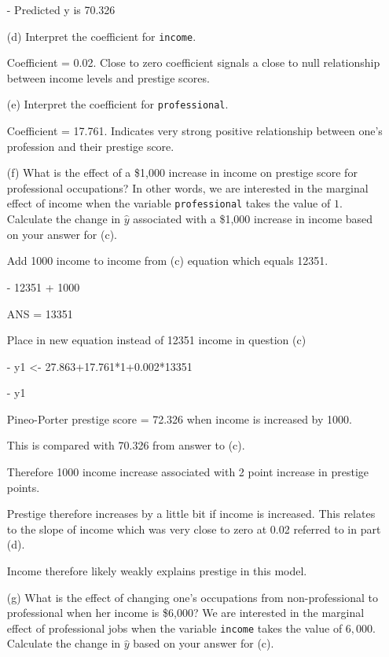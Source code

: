 \documentclass[12pt,letterpaper]{article}
\begin{document}
\begin{enumerate}
-	Predicted y is 70.326
\newpage
	\item [(d)]
	Interpret the coefficient for \texttt{income}.

Coefficient = 0.02. Close to zero coefficient signals a close to null relationship between income levels and prestige scores.
	\vspace{10cm}	
	\item [(e)]
	Interpret the coefficient for \texttt{professional}.

Coefficient = 17.761. Indicates very strong positive relationship between one's profession and their prestige score. 
	
	\newpage
	\item [(f)]
	What is the effect of a \$1,000 increase in income on prestige score for professional occupations? In other words, we are interested in the marginal effect of income when the variable \texttt{professional} takes the value of $1$. Calculate the change in $\hat{y}$ associated with a \$1,000 increase in income based on your answer for (c).
	
Add 1000 income to income from (c) equation which equals 12351. 

- 12351 + 1000 

ANS = 13351

Place in new equation instead of 12351 income in  question (c)

- y1 <- 27.863+17.761*1+0.002*13351

- y1

Pineo-Porter prestige score = 72.326 when income is increased by 1000.

This is compared with 70.326 from answer to (c). 

Therefore 1000 income increase associated with 2 point increase in prestige points. 

Prestige therefore increases by a little bit if income is increased. This relates to the slope of income which was very close to zero at 0.02 referred to in part (d). 

Income therefore likely weakly explains prestige in this model.


	\vspace{10cm}
	
	
	\item [(g)]
	What is the effect of changing one's occupations from non-professional to professional when her income is \$6,000? We are interested in the marginal effect of professional jobs when the variable \texttt{income} takes the value of $6,000$. Calculate the change in $\hat{y}$ based on your answer for (c).
	

\end{enumerate}
\end{document}
